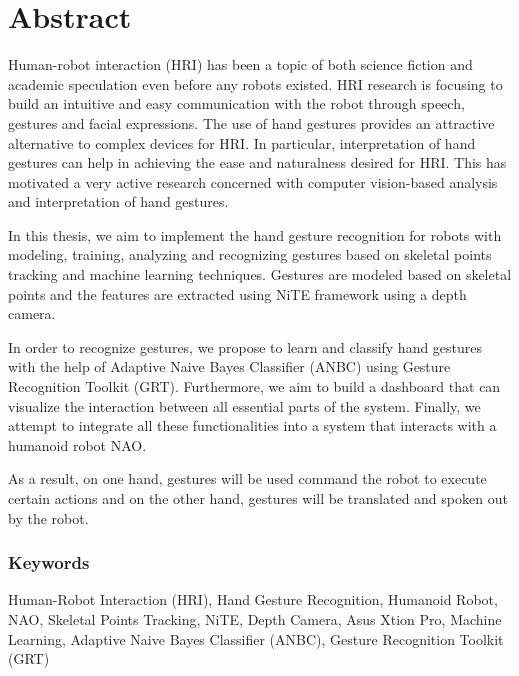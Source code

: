 \chapter*{Abstract} Human-robot interaction (HRI) has been a topic of both science fiction and academic speculation even before any robots existed. HRI research is focusing to build an intuitive and easy communication with the robot through speech, gestures and facial expressions. The use of hand gestures provides an attractive alternative to complex devices for HRI. In particular, interpretation of hand gestures can help in achieving the ease and naturalness desired for HRI. This has motivated a very active research concerned with computer vision-based analysis and interpretation of hand gestures.

In this thesis, we aim to implement the hand gesture recognition for robots with modeling, training, analyzing and recognizing gestures based on skeletal points tracking and machine learning techniques. Gestures are modeled based on skeletal points and the features are extracted using NiTE framework using a depth camera. 

In order to recognize gestures, we propose to learn and classify hand gestures with the help of Adaptive Naive Bayes Classifier (ANBC) using Gesture Recognition Toolkit (GRT). Furthermore, we aim to build a dashboard that can visualize the interaction between all essential parts of the system. Finally, we attempt to integrate all these functionalities into a system that interacts with a humanoid robot NAO.

As a result, on one hand, gestures will be used command the robot to execute certain actions and on the other hand, gestures will be translated and spoken out by the robot. 

\subsection*{Keywords} Human-Robot Interaction (HRI), Hand Gesture Recognition, Humanoid Robot, NAO, Skeletal Points Tracking, NiTE, Depth Camera, Asus Xtion Pro, Machine Learning, Adaptive Naive Bayes Classifier (ANBC), Gesture Recognition Toolkit (GRT) 
